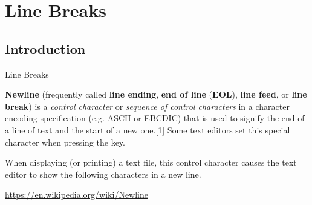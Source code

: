 \documentclass[english,aspectratio=169]{beamer}
\begin{document}
\section{Line Breaks}
\subsection{Introduction}
\begin{frame}{Line Breaks}

\begin{definition}
    \textbf{Newline} (frequently called \textbf{line ending}, \textbf{end of line} (\textbf{EOL}), \textbf{line feed}, or \textbf{line break}) is a \textit{control character} or \textit{sequence of control characters} in a character encoding specification (e.g. ASCII or EBCDIC) that is used to signify the end of a line of text and the start of a new one.[1] Some text editors set this special character when pressing the  key.

When displaying (or printing) a text file, this control character causes the text editor to show the following characters in a new line. 
\end{definition}

\url{https://en.wikipedia.org/wiki/Newline}
\end{frame}
\end{document}
